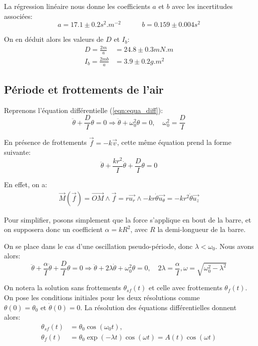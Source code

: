 \documentclass[11pt]{article}
\newcommand{\ut}{\vec{u_\theta}}
\newcommand{\ur}{\vec{u_r}}
\newcommand{\uz}{\vec{u_z}}
\begin{document}
La régression linéaire nous donne les coefficients $a$ et $b$ avec les incertitudes associées:
\begin{equation}
    a = 17.1 \pm 0.2 s^2.m^{-2} \quad \quad \quad b = 0.159 \pm 0.004 s^2
\end{equation}

On en déduit alors les valeurs de $D$ et $I_b$:
\begin{align*}
    D = \frac{2m}{a} & = 24.8 \pm 0.3 mN.m \\
    I_b = \frac{2mb}{a} & = 3.9 \pm 0.2 g.m^2
\end{align*}


\break
\subsection{Période et frottements de l'air}
\label{section:periode}
Reprenons l'équation différentielle (\ref{eqn:equa_diff}):
\begin{equation}
    \ddot \theta + \frac{D}{I}\theta = 0 \Rightarrow \ddot \theta + \omega_0^2 \theta = 0, \quad \omega_0^2 = \frac{D}{I}
    \label{eqn:sans_frottements}
\end{equation}


En présence de frottements $\vec{f} = -k \vec{v}$, cette même équation prend la forme suivante:
\begin{equation}
    \ddot \theta + \frac{k r^2}{I} \dot \theta + \frac{D}{I}\theta = 0
\end{equation}

En effet, on a:
\begin{align}
    \vec{M}(\vec{f}) = \vec{OM} \wedge \vec{f} = r\ur \wedge -k r \dot \theta \ut = -k r^2 \dot \theta \uz
\end{align}

Pour simplifier, posons simplement que la force s'applique en bout de la barre, et on supposera donc un coefficient 
$\alpha = k R^2$, avec $R$ la demi-longueur de la barre.

On se place dans le cas d'une oscillation pseudo-période, donc $\lambda < \omega_0$. Nous avons alors:
\begin{equation}
    \ddot \theta + \frac{\alpha}{I} \dot \theta + \frac{D}{I}\theta = 0 \Rightarrow \ddot \theta + 2\lambda \dot \theta + \omega_0^2\theta = 0, \quad 2\lambda = \frac{\alpha}{I}, \omega = \sqrt{\omega_0^2 - \lambda^2} 
    \label{eqn:avec_frottements}
\end{equation}

On notera la solution sans frottements $\theta_{sf}(t)$ et celle avec frottements $\theta_{f}(t)$. On pose
les conditions initiales pour les deux résolutions comme $\theta(0) = \theta_0 \text{ et } \dot \theta(0) = 0$. La résolution des équations 
différentielles donnent alors:
\begin{align}
    \theta_{sf}(t) &= \theta_0 \cos(\omega_0 t), \quad  \\
    \theta_{f}(t) &= \theta_0 \exp(-\lambda t)\cos(\omega t) = A(t) \cos(\omega t)
\end{align}
\end{document}
